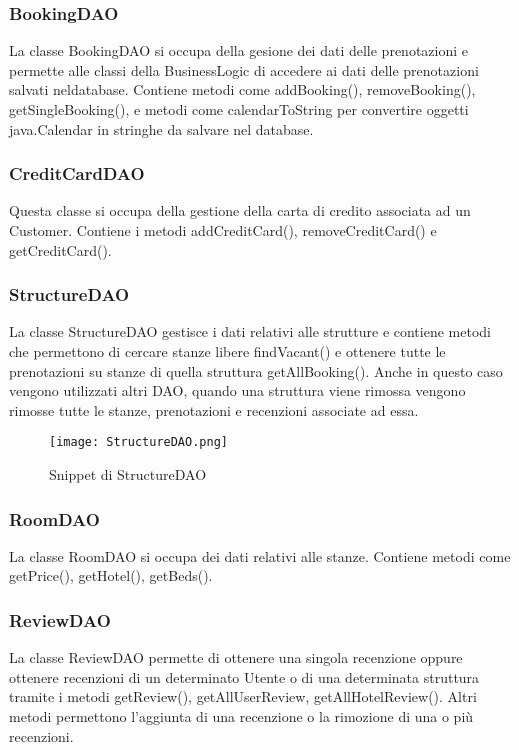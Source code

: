 \documentclass{article}
\begin{document}
\subsubsection{BookingDAO}
La classe BookingDAO si occupa della gesione dei dati delle prenotazioni e permette alle classi della BusinessLogic di accedere ai dati delle prenotazioni salvati neldatabase. Contiene metodi come addBooking(), removeBooking(), getSingleBooking(), e metodi come calendarToString per convertire oggetti java.Calendar in stringhe da salvare nel database.
\subsubsection{CreditCardDAO}
Questa classe si occupa della gestione della carta di credito associata ad un Customer. Contiene i metodi addCreditCard(), removeCreditCard() e getCreditCard().
\subsubsection{StructureDAO}
La classe StructureDAO gestisce i dati relativi alle strutture e contiene metodi che permettono di cercare stanze libere findVacant() e ottenere tutte le prenotazioni su stanze di quella struttura getAllBooking(). Anche in questo caso vengono utilizzati altri DAO, quando una struttura viene rimossa vengono rimosse tutte le stanze, prenotazioni e recenzioni associate ad essa.
\begin{figure}[h!]
    \centering
    \texttt{[image: StructureDAO.png]}
    \caption{Snippet di StructureDAO}
    \label{fig:StructureDAO}
\end{figure}
\subsubsection{RoomDAO}
La classe RoomDAO si occupa dei dati relativi alle stanze. Contiene metodi come getPrice(), getHotel(), getBeds().
\subsubsection{ReviewDAO}
La classe ReviewDAO permette di ottenere una singola recenzione oppure ottenere recenzioni di un determinato Utente o di una determinata struttura tramite i metodi getReview(), getAllUserReview, getAllHotelReview(). Altri metodi permettono l'aggiunta di una recenzione o la rimozione di una o più recenzioni.
\end{document}
